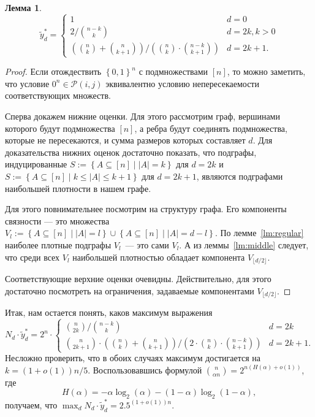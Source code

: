\documentclass[12pt]{article}
\newcommand{\set}[1]{\left\{#1\right\}}
\newcommand{\abs}[1]{\left|#1\right|}
\newcommand{\zo}{\set{0, 1}}
\newcommand{\Pc}{\mathcal{P}}
\newcommand{\setst}[2]{\set{#1 \mid #2}}
\newtheorem{lemma}{Лемма}
\begin{document}
    \begin{lemma}
        $$
            \tilde{y}_d^* = \begin{cases}
                1 & d = 0 \\
                2 / \binom{n - k}{k} & d = 2k, k > 0 \\
                \left(\binom{n}{k} + \binom{n}{k + 1}\right) / \left(\binom{n}{k} \cdot \binom{n - k}{k + 1}\right) & d = 2k + 1.
            \end{cases}
        $$
    \end{lemma}
    \begin{proof}
        Если отождествить $\zo^n$ с подмножествами $[n]$, то можно заметить, что условие $0^n \in \Pc(i, j)$ эквивалентно условию непересекаемости соответствующих множеств.

        Сперва докажем нижние оценки.
        Для этого рассмотрим граф, вершинами которого будут подмножества $[n]$, а ребра будут соединять подмножества,
        которые не пересекаются, и сумма размеров которых составляет $d$.
        Для доказательства нижних оценок достаточно показать, что подграфы,
        индуцированные $S := \setst{A \subseteq [n]}{\abs{A} = k}$ для $d = 2k$ и $S := \setst{A \subseteq [n]}{k \leq \abs{A} \leq k + 1}$
        для $d = 2k + 1$, являются подграфами наибольшей плотности в нашем графе.

        Для этого повнимательнее посмотрим на структуру графа. Его компоненты связности --- это множества
        $V_l := \setst{A \subseteq [n]}{\abs{A} = l} \cup \setst{A \subseteq [n]}{\abs{A} = d - l}$.
        По лемме~\ref{lm:regular} наиболее плотные подграфы $V_l$~--- это сами $V_l$. А из леммы~\ref{lm:middle} следует, что
        среди всех $V_l$ наибольшей плотностью обладает компонента $V_{\lfloor d / 2\rfloor}$.

        Соответствующие верхние оценки очевидны. Действительно, для этого достаточно посмотреть на ограничения, задаваемые компонентами $V_{\lfloor d / 2\rfloor}$.

    \end{proof}

    Итак, нам остается понять, каков максимум выражения
    $$
        N_d \cdot \tilde{y}_d^* = 2^n \cdot \begin{cases}
            \binom{n}{2k} / \binom{n - k}{k} & d = 2k \\
            \binom{n}{2k + 1} \cdot \left(\binom{n}{k} + \binom{n}{k + 1}\right) / \left(2 \cdot \binom{n}{k} \cdot \binom{n - k}{k + 1}\right) & d = 2k + 1.
        \end{cases}
    $$
    Несложно проверить, что в обоих случаях максимум достигается на $k = (1 + o(1)) n / 5$. Воспользовавшись формулой $\binom{n}{\alpha n}=2^{n(H(\alpha)+o(1))}$, где
    $$
        H(\alpha) = -\alpha\log_2(\alpha) -(1-\alpha)\log_2(1-\alpha),
    $$ получаем, что $\max_d N_d \cdot \tilde{y}_d^* = 2.5^{(1+o(1))n}$.
\end{document}
